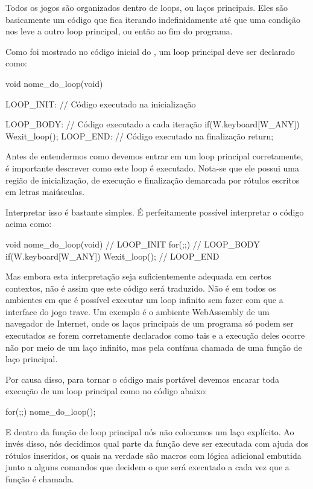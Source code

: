
Todos os jogos são organizados dentro de loops, ou laços
principais. Eles são basicamente um código que fica iterando
indefinidamente até que uma condição nos leve a outro loop principal,
ou então ao fim do programa.

Como foi mostrado no código inicial do , um loop
principal deve ser declarado como:

\alinhaverbatim
void nome\_do\_loop(void){
 LOOP\_INIT: // Código executado na inicialização

 LOOP\_BODY: // Código executado a cada iteração
    if(W.keyboard[W\_ANY])
        Wexit\_loop();
 LOOP\_END: // Código executado na finalização
    return;
}
\alinhanormal

Antes de entendermos como devemos entrar em um loop principal
corretamente, é importante descrever como este loop é
executado. Nota-se que ele possui uma região de inicialização, de
execução e finalização demarcada por rótulos escritos em letras
maiúsculas.

Interpretar isso é bastante simples. É perfeitamente possível
interpretar o código acima como:

\alinhaverbatim
void nome\_do\_loop(void){
  // LOOP\_INIT
  for(;;){
    // LOOP\_BODY
    if(W.keyboard[W\_ANY])
        Wexit\_loop();
  }
  // LOOP\_END
}
\alinhanormal

Mas embora esta interpretação seja suficientemente adequada em certos
contextos, não é assim que este código será traduzido. Não é em todos
os ambientes em que é possível executar um loop infinito sem fazer com
que a interface do jogo trave. Um exemplo é o ambiente WebAssembly de
um navegador de Internet, onde os laços principais de um programa só
podem ser executados se forem corretamente declarados como tais e a
execução deles ocorre não por meio de um laço infinito, mas pela
contínua chamada de uma função de laço principal.

Por causa disso, para tornar o código mais portável devemos encarar
toda execução de um loop principal como no código abaixo:

\alinhaverbatim
for(;;)
  nome\_do\_loop();
\alinhanormal

E dentro da função de loop principal nós não colocamos um laço
explícito. Ao invés disso, nós decidimos qual parte da função deve ser
executada com ajuda dos rótulos inseridos, os quais na verdade são
macros com lógica adicional embutida junto a alguns
comandos  que decidem o que será executado a cada vez
que a função é chamada.

